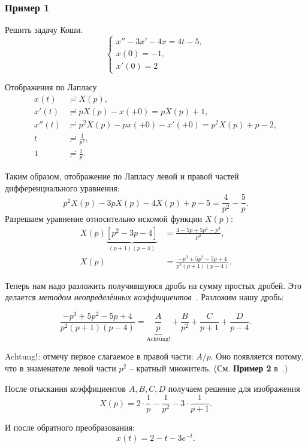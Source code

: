 \documentclass[12pt]{report}
\begin{document}
\subsubsection{Пример 1~\cite{difur}} Решить задачу Коши.
\[
\begin{cases}
x'' - 3x' - 4x = 4t - 5, \\
x(0) = -1, \\
x'(0) = 2
\end{cases}
\]

Отображения по Лапласу
\begin{align*}
	x(t) &\risingdotseq X(p), \\
	x'(t) &\risingdotseq pX(p) - x(+0) = pX(p) + 1, \\
	x''(t) &\risingdotseq p^2X(p) - px(+0) - x'(+0) = p^2X(p) + p - 2, \\
	t &\risingdotseq \frac{1}{p^2}, \\
	1 &\risingdotseq \frac1p.
\end{align*}

Таким образом, отображение по Лапласу левой и правой частей дифференциального уравнения:
\[
p^2 X(p) - 3pX(p) -4X(p) + p - 5 = \frac{4}{p^2} - \frac{5}{p}.
\]
Разрешаем уравнение относительно искомой функции $X(p)$:
\begin{align*}
	X(p)\underbrace{\left[p^2 - 3p - 4\right]}_{(p+1)(p-4)} &= \frac{4 - 5p + 5p^2 - p^3}{p^2}, \\
	X(p) &= \frac{-p^3 + 5p^2 - 5p + 4}{p^2(p+1)(p-4)}.
\end{align*}

Теперь нам надо разложить получившуюся дробь на сумму простых дробей. Это делается \emph{методом неопределённых коэффициентов}~\cite{indefinite-coef-method}. Разложим нашу дробь:

\begin{equation*}
\frac{-p^3 + 5p^2 - 5p + 4}{p^2(p+1)(p-4)} = \underbrace{\frac{A}{p}}_{\text{Achtung!}} + \frac{B}{p^2} + \frac{C}{p+1} + \frac{D}{p-4}.
\end{equation*}

Achtung!: отмечу первое слагаемое в правой части: $A/p$. Оно появляется потому, что в знаменателе левой части $p^2$ -- кратный множитель. (См. \textbf{Пример 2} в~\cite{indefinite-coef-method}.)

После отыскания коэффициентов $A,B,C,D$ получаем решение для изображения
\[
X(p) = 2\cdot\frac1p - \frac{1}{p^2} - 3\cdot\frac{1}{p+1}.
\]

И после обратного преобразования:
\[
x(t) = 2 - t - 3e^{-t}.
\]
\end{document}
